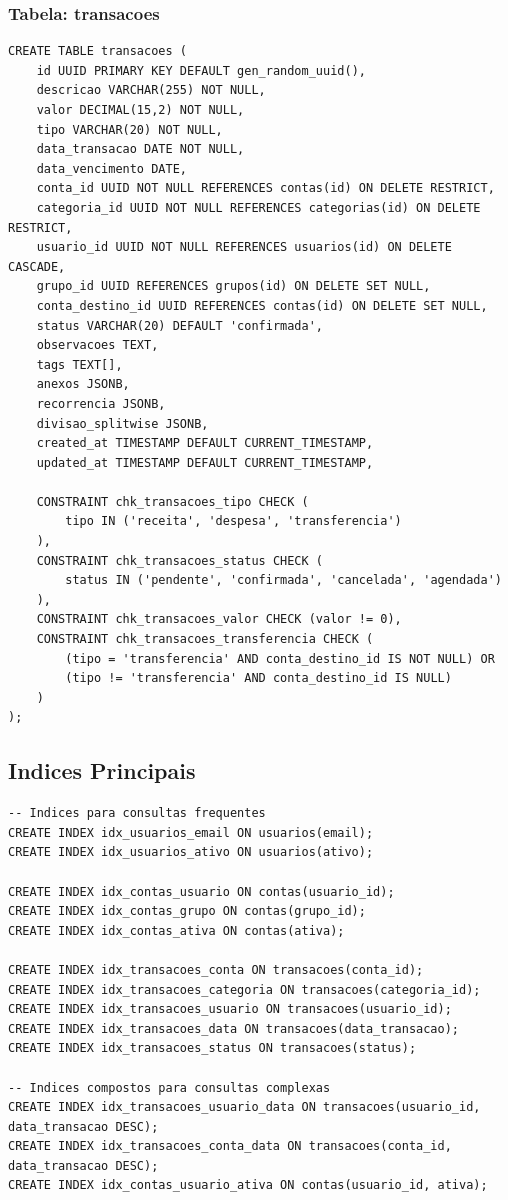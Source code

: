 \subsubsection{Tabela: transacoes}
\begin{lstlisting}[caption=Estrutura da tabela transacoes]
CREATE TABLE transacoes (
    id UUID PRIMARY KEY DEFAULT gen_random_uuid(),
    descricao VARCHAR(255) NOT NULL,
    valor DECIMAL(15,2) NOT NULL,
    tipo VARCHAR(20) NOT NULL,
    data_transacao DATE NOT NULL,
    data_vencimento DATE,
    conta_id UUID NOT NULL REFERENCES contas(id) ON DELETE RESTRICT,
    categoria_id UUID NOT NULL REFERENCES categorias(id) ON DELETE RESTRICT,
    usuario_id UUID NOT NULL REFERENCES usuarios(id) ON DELETE CASCADE,
    grupo_id UUID REFERENCES grupos(id) ON DELETE SET NULL,
    conta_destino_id UUID REFERENCES contas(id) ON DELETE SET NULL,
    status VARCHAR(20) DEFAULT 'confirmada',
    observacoes TEXT,
    tags TEXT[],
    anexos JSONB,
    recorrencia JSONB,
    divisao_splitwise JSONB,
    created_at TIMESTAMP DEFAULT CURRENT_TIMESTAMP,
    updated_at TIMESTAMP DEFAULT CURRENT_TIMESTAMP,
    
    CONSTRAINT chk_transacoes_tipo CHECK (
        tipo IN ('receita', 'despesa', 'transferencia')
    ),
    CONSTRAINT chk_transacoes_status CHECK (
        status IN ('pendente', 'confirmada', 'cancelada', 'agendada')
    ),
    CONSTRAINT chk_transacoes_valor CHECK (valor != 0),
    CONSTRAINT chk_transacoes_transferencia CHECK (
        (tipo = 'transferencia' AND conta_destino_id IS NOT NULL) OR
        (tipo != 'transferencia' AND conta_destino_id IS NULL)
    )
);
\end{lstlisting}

\subsection{Indices Principais}

\begin{lstlisting}[caption=Indices para otimizacao de performance]
-- Indices para consultas frequentes
CREATE INDEX idx_usuarios_email ON usuarios(email);
CREATE INDEX idx_usuarios_ativo ON usuarios(ativo);

CREATE INDEX idx_contas_usuario ON contas(usuario_id);
CREATE INDEX idx_contas_grupo ON contas(grupo_id);
CREATE INDEX idx_contas_ativa ON contas(ativa);

CREATE INDEX idx_transacoes_conta ON transacoes(conta_id);
CREATE INDEX idx_transacoes_categoria ON transacoes(categoria_id);
CREATE INDEX idx_transacoes_usuario ON transacoes(usuario_id);
CREATE INDEX idx_transacoes_data ON transacoes(data_transacao);
CREATE INDEX idx_transacoes_status ON transacoes(status);

-- Indices compostos para consultas complexas
CREATE INDEX idx_transacoes_usuario_data ON transacoes(usuario_id, data_transacao DESC);
CREATE INDEX idx_transacoes_conta_data ON transacoes(conta_id, data_transacao DESC);
CREATE INDEX idx_contas_usuario_ativa ON contas(usuario_id, ativa);
\end{lstlisting}

